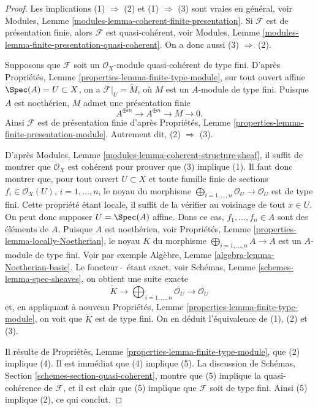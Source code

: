 \begin{proof}
Les implications (1) $\Rightarrow$ (2) et (1) $\Rightarrow$ (3) sont vraies
en général, voir
Modules, Lemme \ref{modules-lemma-coherent-finite-presentation}.
Si $\mathcal{F}$ est de présentation finie, alors $\mathcal{F}$ est
quasi-cohérent, voir
Modules, Lemme \ref{modules-lemma-finite-presentation-quasi-coherent}.
On a donc aussi (3) $\Rightarrow$ (2).

\medskip\noindent
Supposons que $\mathcal{F}$ soit un $\mathcal{O}_X$-module quasi-cohérent de type fini.
D'après
Propriétés, Lemme \ref{properties-lemma-finite-type-module},
sur tout ouvert affine
$\Spec(A) = U \subset X$, on a $\mathcal{F}|_U = \widetilde M$,
où $M$ est un $A$-module de type fini. Puisque $A$ est noethérien,
$M$ admet une présentation finie
$$
A^{\oplus m} \to A^{\oplus n} \to M \to 0.
$$
Ainsi $\mathcal{F}$ est de présentation finie d'après
Propriétés, Lemme \ref{properties-lemma-finite-presentation-module}.
Autrement dit, (2) $\Rightarrow$ (3).

\medskip\noindent
D'après Modules, Lemme \ref{modules-lemma-coherent-structure-sheaf}, il suffit
de montrer que $\mathcal{O}_X$ est cohérent pour prouver que (3)
implique (1). Il faut donc montrer que, pour tout ouvert $U \subset X$ et
toute famille finie de sections $f_i \in \mathcal{O}_X(U)$,
$i = 1, \ldots, n$, le noyau du morphisme
$\bigoplus_{i = 1, \ldots, n} \mathcal{O}_U \to \mathcal{O}_U$
est de type fini. Cette propriété étant locale,
il suffit de la vérifier au voisinage de tout $x \in U$.
On peut donc supposer $U = \Spec(A)$ affine. Dans ce cas,
$f_1, \ldots, f_n \in A$ sont des éléments de $A$. Puisque $A$ est
noethérien, voir
Propriétés, Lemme \ref{properties-lemma-locally-Noetherian},
le noyau $K$ du morphisme $\bigoplus_{i = 1, \ldots, n} A \to A$
est un $A$-module de type fini. Voir par exemple
Algèbre, Lemme \ref{algebra-lemma-Noetherian-basic}.
Le foncteur\ $\widetilde{ }$\ étant exact, voir
Schémas, Lemme \ref{schemes-lemma-spec-sheaves},
on obtient une suite exacte
$$
\widetilde K \to
\bigoplus\nolimits_{i = 1, \ldots, n} \mathcal{O}_U \to
\mathcal{O}_U
$$
et, en appliquant à nouveau
Propriétés, Lemme \ref{properties-lemma-finite-type-module},
on voit que $\widetilde K$ est de type fini. On en déduit
l'équivalence de (1), (2) et (3).

\medskip\noindent
Il résulte de
Propriétés, Lemme \ref{properties-lemma-finite-type-module},
que (2) implique (4). Il est immédiat que (4) implique (5).
La discussion de
Schémas, Section \ref{schemes-section-quasi-coherent},
montre que (5) implique
la quasi-cohérence de $\mathcal{F}$, et il est clair que (5)
implique que $\mathcal{F}$ soit de type fini. Ainsi (5) implique
(2), ce qui conclut.
\end{proof}

